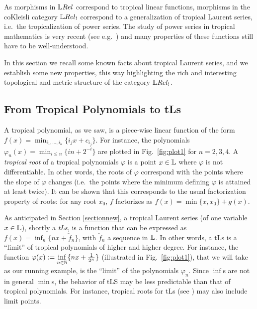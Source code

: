 
As morphisms in $\LREL$ correspond to tropical linear functions, morphisms in the coKleisli category $\LREL_{!}$ 
correspond to a generalization of tropical Laurent series, i.e.~the tropicalization of power series. 
The study of power series in tropical mathematics is very recent (see e.g.~\cite{Porzio2021}) and many properties of these functions still have to be well-understood. 

In this section we recall some known facts about tropical Laurent series, and we establish some new properties, this way highlighting the rich and interesting topological and metric structure of the category $\LREL_{!}$.

%

\subsection{From Tropical Polynomials to tLs}

A tropical polynomial, as we saw, is a piece-wise linear function of the form $f(x)=\min_{i_{1},\dots, i_{k}}\{i_{j}x+c_{i_{j}}\}$. For instance, the polynomials $\varphi_{n}(x)=\min_{i\leq n}\{in+2^{-i}\}$
are plotted in Fig.~\ref{fig:plot1} for $n=2,3,4$.
A \emph{tropical root} of a tropical polynomials $\varphi$ is a point $x\in \mathbb{L}$ where $\varphi$ is not differentiable. In other words, the roots of $\varphi$ correspond with the points where the slope of $\varphi$ changes (i.e.~the points where the minimum defining $\varphi$ is attained at least twice). 
It can be shown that this corresponds to the usual factorization property of roots: for any root $x_{0}$, $f$ factorizes as
$f(x)=\min\{x,x_{0}\}+ g(x)$.
%



As anticipated in Section \ref{sectionnew}, a tropical Laurent series (of one variable $x\in\mathbb{L}$), shortly a \emph{tLs}, is a function that can be expressed as $f(x)=\inf_{n}\{nx+\check f_{n}\}$, with $\check  f_{n}$ a sequence in $\mathbb{L}$. In other words, a tLs is a ``limit'' of tropical polynomials of higher and higher degree. For instance, the function $\varphi(x):=\inf\limits_{n\in\mathbb{N}}\{nx+\frac{1}{2^n}\}$ (illustrated in Fig.~\ref{fig:plot1}), that we will take as our running example, 
is the ``limit'' of the polynomials $\varphi_{n}$. Since $\inf$s are not in general $\min$s, the behavior of tLS may be less predictable than that of tropical polynomials. For instance, tropical roots for tLs (see \cite{Porzio2021}) may also include limit points.


